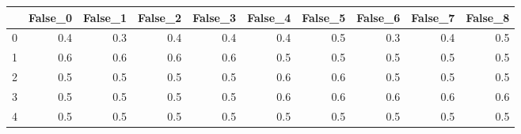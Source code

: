 \begin{tabular}{lrrrrrrrrr}
\toprule
{} &  False\_0 &  False\_1 &  False\_2 &  False\_3 &  False\_4 &  False\_5 &  False\_6 &  False\_7 &  False\_8 \\ \hline
\midrule
0 &      0.4 &      0.3 &      0.4 &      0.4 &      0.4 &      0.5 &      0.3 &      0.4 &      0.5 \\ \hline
1 &      0.6 &      0.6 &      0.6 &      0.6 &      0.5 &      0.5 &      0.5 &      0.5 &      0.5 \\ \hline
2 &      0.5 &      0.5 &      0.5 &      0.5 &      0.6 &      0.6 &      0.5 &      0.5 &      0.5 \\ \hline
3 &      0.5 &      0.5 &      0.5 &      0.5 &      0.6 &      0.6 &      0.6 &      0.6 &      0.6 \\ \hline
4 &      0.5 &      0.5 &      0.5 &      0.5 &      0.5 &      0.5 &      0.5 &      0.5 &      0.5 \\ \hline
\bottomrule
\end{tabular}
